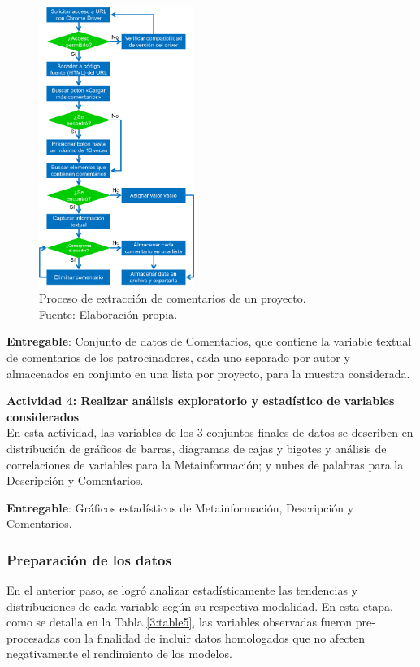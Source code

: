 \begin{figure}[h]
	\begin{center}
		\includegraphics[width=0.45\textwidth]{3/figures/diagrama_flujo_scrapping_comentarios.png}
		\caption[Proceso de extracción de comentarios de un proyecto]{Proceso de extracción de comentarios de un proyecto.\\
			Fuente: Elaboración propia.}
		\label{3:fig7}
	\end{center}
\end{figure}

\textbf{Entregable}: Conjunto de datos de Comentarios, que contiene la variable textual de comentarios de los patrocinadores, cada uno separado por autor y almacenados en conjunto en una lista por proyecto, para la muestra considerada.

\textbf{Actividad 4: Realizar análisis exploratorio y estadístico de variables considerados}
\\
En esta actividad, las variables de los 3 conjuntos finales de datos se describen en distribución de gráficos de barras, diagramas de cajas y bigotes y análisis de correlaciones de variables para la Metainformación; y nubes de palabras para la Descripción y Comentarios.

\textbf{Entregable}: Gráficos estadísticos de Metainformación, Descripción y Comentarios.

\subsubsection{Preparación de los datos}
En el anterior paso, se logró analizar estadísticamente las tendencias y distribuciones de cada variable según su respectiva modalidad. En esta etapa, como se detalla en la Tabla \ref{3:table5}, las variables observadas fueron pre-procesadas con la finalidad de incluir datos homologados que no afecten negativamente el rendimiento de los modelos.

